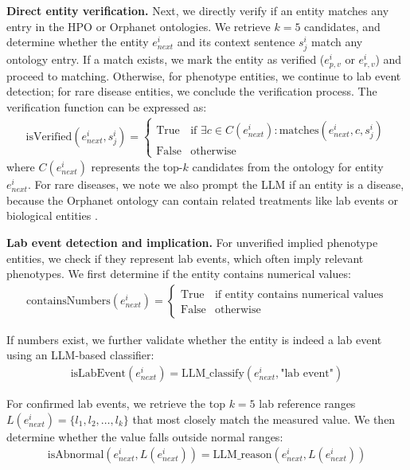 \textbf{Direct entity verification.} Next, we directly verify if an entity matches any entry in the HPO or Orphanet ontologies. We retrieve $k=5$ candidates, and determine whether the entity $e_{next}^i$ and its context sentence $s_j^i$ match any ontology entry. If a match exists, we mark the entity as verified ($e_{p,v}^i$ or $e_{r,v}^i$) and proceed to matching. Otherwise, for phenotype entities, we continue to lab event detection; for rare disease entities, we conclude the verification process. The verification function can be expressed as:
\begin{align}
\text{isVerified}(e_{next}^i, s_j^i) = 
\begin{cases}
\text{True} & \text{if } \exists c \in C(e_{next}^i) : \text{matches}(e_{next}^i, c, s_j^i) \\
\text{False} & \text{otherwise}
\end{cases}
\end{align}
where $C(e_{next}^i)$ represents the top-$k$ candidates from the ontology for entity $e_{next}^i$. For rare diseases, we note we also prompt the LLM if an entity is a disease, because the Orphanet ontology can contain related treatments like lab events or biological entities \cite{weinreich2008orphanet}.

\textbf{Lab event detection and implication.} For unverified implied phenotype entities, we check if they represent lab events, which often imply relevant phenotypes. We first determine if the entity contains numerical values:
\begin{align}
\text{containsNumbers}(e_{next}^i) = 
\begin{cases}
\text{True} & \text{if entity contains numerical values} \\
\text{False} & \text{otherwise}
\end{cases}
\end{align}

If numbers exist, we further validate whether the entity is indeed a lab event using an LLM-based classifier:
\begin{align}
\text{isLabEvent}(e_{next}^i) = \text{LLM\_classify}(e_{next}^i, \text{"lab event"})
\end{align}

For confirmed lab events, we retrieve the top $k=5$ lab reference ranges $L(e_{next}^i) = \{l_1, l_2, \ldots, l_k\}$ that most closely match the measured value. We then determine whether the value falls outside normal ranges:
\begin{align}
\text{isAbnormal}(e_{next}^i, L(e_{next}^i)) = \text{LLM\_reason}(e_{next}^i, L(e_{next}^i))
\end{align}

